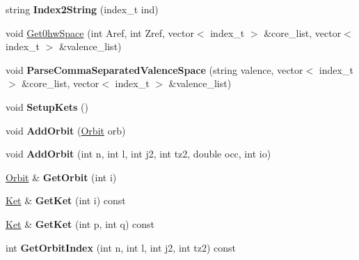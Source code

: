 \begin{DoxyCompactItemize}
\item 
string {\bfseries Index2\+String} (index\+\_\+t ind)\hypertarget{classModelSpace_a965622c0dbf06befd5fc30aeca746153}{}\label{classModelSpace_a965622c0dbf06befd5fc30aeca746153}

\item 
void \hyperlink{classModelSpace_a0f4d1a532822a9c453b3bd3684b8231c}{Get0hw\+Space} (int Aref, int Zref, vector$<$ index\+\_\+t $>$ \&core\+\_\+list, vector$<$ index\+\_\+t $>$ \&valence\+\_\+list)
\item 
void {\bfseries Parse\+Comma\+Separated\+Valence\+Space} (string valence, vector$<$ index\+\_\+t $>$ \&core\+\_\+list, vector$<$ index\+\_\+t $>$ \&valence\+\_\+list)\hypertarget{classModelSpace_a8bf7d2334ca35a9dc282ee2b5466e46e}{}\label{classModelSpace_a8bf7d2334ca35a9dc282ee2b5466e46e}

\item 
void {\bfseries Setup\+Kets} ()\hypertarget{classModelSpace_ae1a3578ed5aabec2956998a870a4e2d2}{}\label{classModelSpace_ae1a3578ed5aabec2956998a870a4e2d2}

\item 
void {\bfseries Add\+Orbit} (\hyperlink{classOrbit}{Orbit} orb)\hypertarget{classModelSpace_ad8acc2ca5b475862101595d911987a7e}{}\label{classModelSpace_ad8acc2ca5b475862101595d911987a7e}

\item 
void {\bfseries Add\+Orbit} (int n, int l, int j2, int tz2, double occ, int io)\hypertarget{classModelSpace_a8bc32511dc8b05203c6352343a539a57}{}\label{classModelSpace_a8bc32511dc8b05203c6352343a539a57}

\item 
\hyperlink{classOrbit}{Orbit} \& {\bfseries Get\+Orbit} (int i)\hypertarget{classModelSpace_a9a958612b1dcf52caf0bf16539026bb4}{}\label{classModelSpace_a9a958612b1dcf52caf0bf16539026bb4}

\item 
\hyperlink{classKet}{Ket} \& {\bfseries Get\+Ket} (int i) const \hypertarget{classModelSpace_adc36e64fb3bb4dc76819f91e9057844f}{}\label{classModelSpace_adc36e64fb3bb4dc76819f91e9057844f}

\item 
\hyperlink{classKet}{Ket} \& {\bfseries Get\+Ket} (int p, int q) const \hypertarget{classModelSpace_ab3662f5e12ce6da0164c8adbe1abbb95}{}\label{classModelSpace_ab3662f5e12ce6da0164c8adbe1abbb95}

\item 
int {\bfseries Get\+Orbit\+Index} (int n, int l, int j2, int tz2) const \hypertarget{classModelSpace_ab3d8cb8214e082773caa5820773ee16e}{}\label{classModelSpace_ab3d8cb8214e082773caa5820773ee16e}


\end{DoxyCompactItemize}
